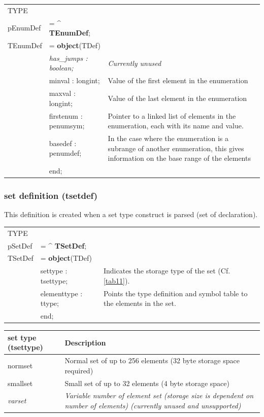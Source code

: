 \documentclass [12pt]{article}
\begin{document}
\begin{tabular*}{6,5in}{|l@{\extracolsep{\fill}}lp{}|}
\hline
\textsf{TYPE} & & \\
\xspace \textsf{pEnumDef} &= \^{} \textbf{TEnumDef};&  \\
\xspace \textsf{TEnumDef} &= \textbf{object}(TDef) & \\
&\textsf{\textit{has{\_}jumps : boolean;}}& 
    \textit{Currently unused} \\
&\textsf{minval : longint;}& 
    Value of the first element in the enumeration \\
&\textsf{maxval : longint;}& 
    Value of the last element in the enumeration \\
&\textsf{firstenum : penumsym;}& 
    Pointer to a linked list of elements in the enumeration, each with
    its name and value. \\
&\textsf{basedef : penumdef;}& 
    In the case where the enumeration is a subrange of another enumeration,
    this gives information on the base range of the elements \\
&\textsf{end;}&  \\
\hline
\end{tabular*}

\subsubsection{set definition (tsetdef)}
\label{subsubsec:mylabel10}

This definition is created when a set type construct is parsed (\textsf{set 
of declaration}). 

\begin{tabular*}{6.5in}{|l@{\extracolsep{\fill}}lp{}|}
\hline
\textsf{TYPE} & & \\
\xspace \textsf{pSetDef} &= \^{} \textbf{TSetDef};&  \\
\xspace \textsf{TSetDef} &= \textbf{object}(TDef) & \\
&\textsf{settype : tsettype;}& 
    Indicates the storage type of the set (Cf. \ref{tab11}). \\
&\textsf{elementtype : ttype;}& 
    Points the type definition and symbol table to the elements in the set. \\
&\textsf{end;}&  \\
\hline
\end{tabular*}

\begin{longtable}{|l|p{10cm}|}
\hline
set type (tsettype) & Description \\
\hline
\endhead
\hline
\endfoot
\textsf{normset}& 
    Normal set of up to 256 elements (32 byte storage space required) \\
\textsf{smallset}& 
    Small set of up to 32 elements (4 byte storage space) \\
\textsf{\textit{varset}}& 
    \textit{Variable number of element set (storage size is dependent on number
    of elements) (currently unused and unsupported)} \\
\end{longtable}
\end{document}
